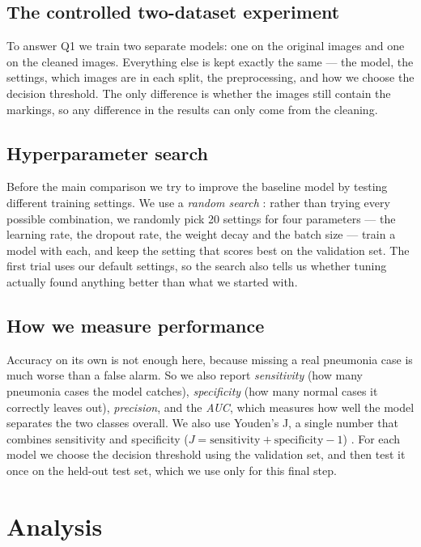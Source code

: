 \documentclass[10pt,twocolumn]{article}
\begin{document}
\subsection{The controlled two-dataset experiment}
\label{sec:locked}
To answer Q1 we train two separate models: one on the original images and one on
the cleaned images. Everything else is kept exactly the same --- the model, the
settings, which images are in each split, the preprocessing, and how we choose the
decision threshold. The only difference is whether the images still contain the
markings, so any difference in the results can only come from the cleaning.

\subsection{Hyperparameter search}
\label{sec:search}
Before the main comparison we try to improve the baseline model by testing
different training settings. We use a \emph{random search}
\cite{bergstra2012random}: rather than trying every possible combination, we
randomly pick 20 settings for four parameters --- the learning rate, the dropout
rate, the weight decay and the batch size --- train a model with each, and keep
the setting that scores best on the validation set. The first trial uses our
default settings, so the search also tells us whether tuning actually found
anything better than what we started with.

\subsection{How we measure performance}
\label{sec:eval}
Accuracy on its own is not enough here, because missing a real pneumonia case is
much worse than a false alarm. So we also report \emph{sensitivity} (how many
pneumonia cases the model catches), \emph{specificity} (how many normal cases it
correctly leaves out), \emph{precision}, and the \emph{AUC}, which measures how
well the model separates the two classes overall. We also use Youden's J, a single
number that combines sensitivity and specificity ($J=\text{sensitivity}+
\text{specificity}-1$) \cite{youden1950}. For each model we choose the decision
threshold using the validation set, and then test it once on the held-out test
set, which we use only for this final step.

\section{Analysis}
\label{sec:analysis}
\end{document}
